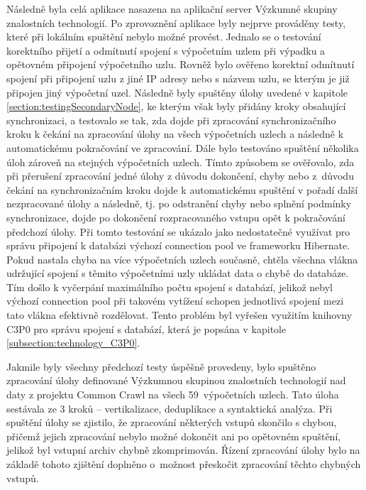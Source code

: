 Následně byla celá aplikace nasazena na aplikační server Výzkumné skupiny znalostních technologií. Po zprovoznění aplikace byly nejprve prováděny testy, které při lokálním spuštění nebylo možné provést. Jednalo se o testování korektního přijetí a odmítnutí spojení s výpočetním uzlem při výpadku a opětovném připojení výpočetního uzlu. Rovněž bylo ověřeno korektní odmítnutí spojení při připojení uzlu z jiné IP adresy nebo s názvem uzlu, se kterým je již připojen jiný výpočetní uzel. Následně byly spuštěny úlohy uvedené v kapitole \ref{section:testingSecondaryNode}, ke kterým však byly přidány kroky obsahující synchronizaci, a testovalo se tak, zda dojde při zpracování synchronizačního kroku k čekání na zpracování úlohy na všech výpočetních uzlech a následně k automatickému pokračování ve zpracování. Dále bylo testováno spuštění několika úloh zároveň na stejných výpočetních uzlech. Tímto způsobem se ověřovalo, zda při přerušení zpracování jedné úlohy z důvodu dokončení, chyby nebo z~důvodu čekání na synchronizačním kroku dojde k automatickému spuštění v pořadí další nezpracované úlohy a následně, tj. po odstranění chyby nebo splnění podmínky synchronizace, dojde po dokončení rozpracovaného vstupu opět k pokračování předchozí úlohy. Při tomto testování se ukázalo jako nedostatečné využívat pro správu připojení k databázi výchozí connection pool ve frameworku Hibernate. Pokud nastala chyba na více výpočetních uzlech současně, chtěla všechna vlákna udržující spojení s těmito výpočetními uzly ukládat data o chybě do databáze. Tím došlo k vyčerpání maximálního počtu spojení s databází, jelikož nebyl výchozí connection pool při takovém vytížení schopen jednotlivá spojení mezi tato vlákna efektivně rozdělovat. Tento problém byl vyřešen využitím knihovny C3P0 pro správu spojení s databází, která je popsána v kapitole \ref{subsection:technology_C3P0}.

Jakmile byly všechny předchozí testy úspěšně provedeny, bylo spuštěno zpracování úlohy definované Výzkumnou skupinou znalostních technologií nad daty z projektu Common Crawl na všech 59~výpočetních uzlech. Tato úloha sestávala ze 3 kroků -- vertikalizace, deduplikace a syntaktická analýza. Při spuštění úlohy se zjistilo, že zpracování některých vstupů skončilo s chybou, přičemž jejich zpracování nebylo možné dokončit ani po opětovném spuštění, jelikož byl vstupní archiv chybně zkomprimován. Řízení zpracování úlohy bylo na základě tohoto zjištění doplněno o~možnost přeskočit zpracování těchto chybných vstupů. 

